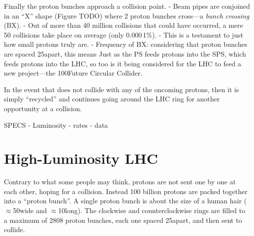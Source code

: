 Finally the proton bunches approach a collision point.
- Beam pipes are conjoined in an ``X'' shape (Figure TODO) where 2 proton bunches cross---a \emph{bunch crossing} (BX).
- Out of more than 40 million \pp collisions that could have occurred, a mere 50 collisions take place on average (\ie only 0.000\,1\%).
    - This is a testament to just how small protons truly are.
- Frequency of BX: considering that proton bunches are spaced 25\ns apart, this means 
Just as the PS feeds protons into the SPS, which feeds protons into the LHC, so too is it being considered for the LHC to feed a new project---the 100\Km Future Circular Collider.

In the event that \pname does not collide with any of the oncoming protons, then it is simply ``recycled'' and continues going around the LHC ring for another opportunity at a \pp collision.


SPECS
- Luminosity
- rates
- data

\section{High-Luminosity LHC}




Contrary to what some people may think, protons are not sent one by one at each other, hoping for a collision.
Instead 100 billion protons are packed together into a ``proton bunch''.
A single proton bunch is about the size of a human hair ($\approx$50\mum wide and $\approx$10\cm long). 
The clockwise and counterclockwise rings are filled to a maximum of 2808 proton bunches, each one spaced 25\ns apart, and then sent to collide. 

